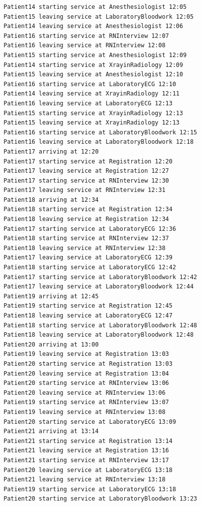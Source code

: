 \documentclass[12pt]{article}
\begin{document}
\begin{verbatim}
		Patient14 starting service at Anesthesiologist 12:05
		Patient15 leaving service at LaboratoryBloodwork 12:05
		Patient14 leaving service at Anesthesiologist 12:06
		Patient16 starting service at RNInterview 12:07
		Patient16 leaving service at RNInterview 12:08
		Patient15 starting service at Anesthesiologist 12:09
		Patient14 starting service at XrayinRadiology 12:09
		Patient15 leaving service at Anesthesiologist 12:10
		Patient16 starting service at LaboratoryECG 12:10
		Patient14 leaving service at XrayinRadiology 12:11
		Patient16 leaving service at LaboratoryECG 12:13
		Patient15 starting service at XrayinRadiology 12:13
		Patient15 leaving service at XrayinRadiology 12:13
		Patient16 starting service at LaboratoryBloodwork 12:15
		Patient16 leaving service at LaboratoryBloodwork 12:18
		Patient17 arriving at 12:20
		Patient17 starting service at Registration 12:20
		Patient17 leaving service at Registration 12:27
		Patient17 starting service at RNInterview 12:30
		Patient17 leaving service at RNInterview 12:31
		Patient18 arriving at 12:34
		Patient18 starting service at Registration 12:34
		Patient18 leaving service at Registration 12:34
		Patient17 starting service at LaboratoryECG 12:36
		Patient18 starting service at RNInterview 12:37
		Patient18 leaving service at RNInterview 12:38
		Patient17 leaving service at LaboratoryECG 12:39
		Patient18 starting service at LaboratoryECG 12:42
		Patient17 starting service at LaboratoryBloodwork 12:42
		Patient17 leaving service at LaboratoryBloodwork 12:44
		Patient19 arriving at 12:45
		Patient19 starting service at Registration 12:45
		Patient18 leaving service at LaboratoryECG 12:47
		Patient18 starting service at LaboratoryBloodwork 12:48
		Patient18 leaving service at LaboratoryBloodwork 12:48
		Patient20 arriving at 13:00
		Patient19 leaving service at Registration 13:03
		Patient20 starting service at Registration 13:03
		Patient20 leaving service at Registration 13:04
		Patient20 starting service at RNInterview 13:06
		Patient20 leaving service at RNInterview 13:06
		Patient19 starting service at RNInterview 13:07
		Patient19 leaving service at RNInterview 13:08
		Patient20 starting service at LaboratoryECG 13:09
		Patient21 arriving at 13:14
		Patient21 starting service at Registration 13:14
		Patient21 leaving service at Registration 13:16
		Patient21 starting service at RNInterview 13:17
		Patient20 leaving service at LaboratoryECG 13:18
		Patient21 leaving service at RNInterview 13:18
		Patient19 starting service at LaboratoryECG 13:18
		Patient20 starting service at LaboratoryBloodwork 13:23

\end{verbatim}
\end{document}
